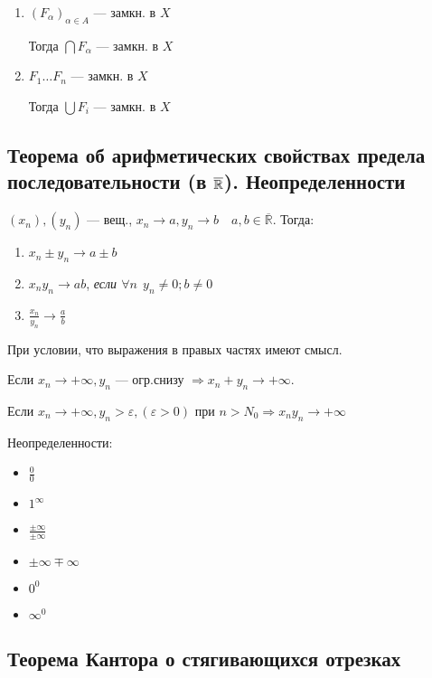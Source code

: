 \begin{enumerate}
    \item $(F_\alpha)_{\alpha\in A}$ --- замкн. в $X$
    
    Тогда $\bigcap F_\alpha$ --- замкн. в $X$

    \item $F_1\ldots F_n$ --- замкн. в $X$
    
    Тогда $\bigcup F_i$ --- замкн. в $X$
\end{enumerate}

\subsection{Теорема об арифметических свойствах предела последовательности  (в $\overline{\operatorname*{\mathbb{R}}}$). Неопределенности}

$(x_n),(y_n)$ --- вещ., $x_n\to a, y_n\to b \quad a,b\in\mathbb{\overline R}$.
Тогда:
\begin{enumerate}
    \item $x_n\pm y_n\to a\pm b$
    \item $x_n y_n\to a b$,
    \textit{если $\forall n \ \ y_n\not=0; b\not=0$}
    \item $\frac{x_n}{y_n}\to\frac{a}{b}$
\end{enumerate}
При условии, что выражения в правых частях имеют смысл.

Если $x_n\to+\infty, y_n$ --- огр.снизу $\Rightarrow x_n+y_n\to+\infty$.

Если $x_n\to+\infty, y_n>\varepsilon, (\varepsilon>0) \text{ при } n>N_0 \Rightarrow x_ny_n\to +\infty$


Неопределенности:
\begin{itemize}
    \itemsep0em
    \item $\frac{0}{0}$
    \item $1^\infty$
    \item $\frac{\pm\infty}{\pm\infty}$
    \item $\pm\infty\mp\infty$
    \item $0^0$
    \item $\infty^0$
\end{itemize}

\subsection{Теорема Кантора о стягивающихся отрезках}

